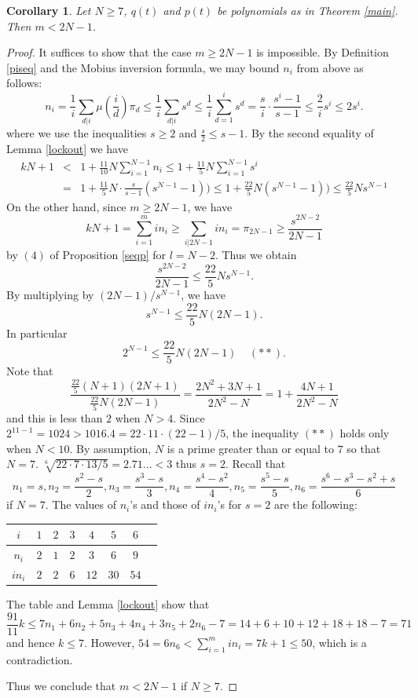 \documentclass[reqno]{amsart}
\numberwithin{equation}{section}
\theoremstyle{plain}
\newtheorem{cor}[equation]{Corollary}
\theoremstyle{definition}
\begin{document}
\begin{cor}\label{7m<2N-1}
Let $N\geq 7$, $q(t)$ and $p(t)$ be polynomials as in Theorem \ref{main}. Then $m<2N-1$.
\end{cor}
\begin{proof}
It suffices to show that the case $m\geq 2N-1$ is impossible. By Definition \ref{piseq} and the Mobius inversion formula, we may bound $n_i$ from above as follows:
$$n_i=\frac{1}{i}\sum_{d|i}\mu\left(\frac{i}{d}\right)\pi_{d}\leq\frac{1}{i}\sum_{d|i} s^d\leq\frac{1}{i}\sum_{d=1}^is^d=\frac{s}{i}\cdot\frac{s^i-1}{s-1}\leq \frac{2}{i}s^i\leq 2s^i.$$
where we use the inequalities $s\geq2$ and $\frac{s}{2}\leq s-1$. 
By the second equality of Lemma \ref{lockout} we have
\begin{eqnarray*}
    kN+1&<&1+\frac{11}{10}N\sum^{N-1}_{i=1}n_i\leq1+\frac{11}{5}N\sum^{N-1}_{i=1}s^i\\
    &=&1+\frac{11}{5}N\cdot\frac{s}{s-1}(s^{N-1}-1))\leq1+\frac{22}{5}N(s^{N-1}-1))\leq\frac{22}{5}Ns^{N-1}
\end{eqnarray*}
On the other hand, since $m\geq 2N-1$, we have
$$kN+1=\sum_{i=1}^min_i\geq\sum_{i|2N-1}in_i=\pi_{2N-1}\geq\frac{s^{2N-2}}{2N-1}$$
by $(4)$ of Proposition \ref{seqp} for $l=N-2$.
Thus we obtain
$$\frac{s^{2N-2}}{2N-1}\leq \frac{22}{5}Ns^{N-1}.$$
By multiplying by $(2N-1)/s^{N-1}$, we have
$$s^{N-1}\leq \frac{22}{5}N(2N-1).$$
In particular
$$2^{N-1}\leq \frac{22}{5}N(2N-1)\ \ \ \ \ (**).$$
Note that
$$\frac{\frac{22}{5}(N+1)(2N+1)}{\frac{22}{5}N(2N-1)}=\frac{2N^2+3N+1}{2N^2-N}=1+\frac{4N+1}{2N^2-N}$$
and this is less than $2$ when $N>4$. Since $2^{11-1}=1024>1016.4=22\cdot 11\cdot (22-1)/5$, the inequality $(**)$ holds only when $N<10$. By assumption, $N$ is a prime greater than or equal to $7$ so that $N=7$. $\sqrt[6]{22\cdot 7\cdot 13/5}=2.71...<3$ thus $s=2$. Recall that
$$n_1=s, n_2=\frac{s^2-s}{2}, n_3=\frac{s^3-s}{3}, n_4=\frac{s^4-s^2}{4}, n_5=\frac{s^5-s}{5}, n_6=\frac{s^6-s^3-s^2+s}{6}$$
if $N=7$. The values of $n_i$'s and those of $in_i$'s for $s=2$ are the following: 

\begin{center}
\begin{tabular}{ |c|c|c|c|c|c|c|c| }
\hline
 $i$ & $1$ & $2$ & $3$ & $4$ & $5$ & $6$ \\
\hline
$n_i$ & $2$ & $1$ & $2$ & $3$ & $6$ & $9$ \\
\hline
$in_i$ & $2$ & $2$ & $6$ & $12$ & $30$ & $54$ \\ 
\hline
\end{tabular}
\end{center}

The table and Lemma \ref{lockout} show that
$$\frac{91}{11}k\leq 7n_1+6n_2+5n_3+4n_4+3n_5+2n_6-7=14+6+10+12+18+18-7=71$$
and hence $k\leq 7$.  However, $54=6n_6<\sum_{i=1}^m in_i=7k+1\leq 50$, which is a contradiction. 

Thus we conclude that $m<2N-1$ if $N\geq 7$.
\end{proof}
\end{document}
